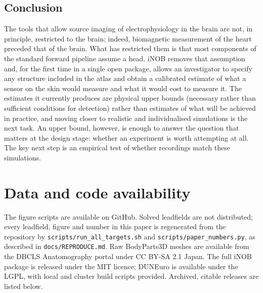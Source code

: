 \documentclass[11pt]{article}
\newcommand{\revised}[1]{#1}
\begin{document}
\subsection{Conclusion}\label{conclusion}

The tools that allow source imaging of electrophysiology in the brain
are not, in principle, restricted to the brain; indeed, biomagnetic
measurement of the heart preceded that of the brain. What has restricted
them is that most components of the standard forward pipeline assume a
head. iNOB removes that assumption and, for the first time in a single
open package, allows an investigator to specify any structure included
in the atlas and obtain a calibrated estimate of what a sensor on the
skin would measure and what it would cost to measure it. The estimates
it currently produces are physical upper bounds (necessary rather than
sufficient conditions for detection) rather than estimates of what will
be achieved in practice, and moving closer to realistic and
individualised simulations is the next task. An upper bound, however, is
enough to answer the question that matters at the design stage: whether
an experiment is worth attempting at all. The key next step is an
empirical test of whether recordings match these simulations.

\section{Data and code availability}\label{data-and-code-availability}

\revised{The figure scripts are available on GitHub}. \revised{Solved leadfields are not distributed;
every leadfield, figure and number in this paper is regenerated from the
repository by \texttt{scripts/run\_all\_targets.sh} and
\texttt{scripts/paper\_numbers.py}, as described in
\texttt{docs/REPRODUCE.md}.}
Raw BodyParts3D meshes are available from the DBCLS Anatomography portal
under CC BY-SA 2.1 Japan. The full iNOB package is released under the
MIT licence; DUNEuro is available under the LGPL, with local and cluster
build scripts provided. Archived, citable releases are listed below.
\end{document}
